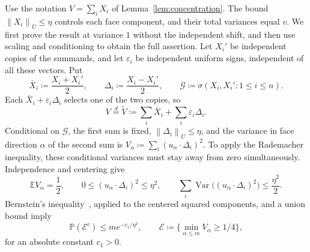 \documentclass[11pt,letterpaper]{article}
\theoremstyle{remark}
\newcommand{\E}{\mathbb E}
\newcommand{\Pp}{\mathbb P}
\newcommand{\Var}{\operatorname{Var}}
\newcommand{\norm}[1]{\left\lVert#1\right\rVert}
\begin{document}
Use the notation \(V=\sum_iX_i\) of Lemma~\ref{lem:concentration}.
The bound \(\norm{X_i}_U\le\eta\) controls each face component,
and their total variances equal \(v\). We first prove the result
at variance \(1\) without the independent shift, and then use scaling
and conditioning to obtain the full assertion. Let \(X_i'\) be independent copies of the
summands, and let \(\varepsilon_i\) be independent uniform signs,
independent of all these vectors. Put
\[
 \bar X_i\coloneqq\frac{X_i+X_i'}2,\qquad
 \Delta_i\coloneqq\frac{X_i-X_i'}2,\qquad
 \mathcal G\coloneqq\sigma(X_i,X_i':1\le i\le n).
\]
Each \(\bar X_i+\varepsilon_i\Delta_i\) selects one of the two
copies, so
\begin{equation}
 V\stackrel d=\widetilde V\coloneqq
 \sum_i\bar X_i+\sum_i\varepsilon_i\Delta_i.
 \label{appx-eq:pair-representation}
\end{equation}
Conditional on \(\mathcal G\), the first sum is fixed,
\(\norm{\Delta_i}_U\le\eta\), and the variance in face direction
\(\alpha\) of the second sum is
\(V_\alpha\coloneqq\sum_i(u_\alpha\cdot\Delta_i)^2\).
To apply the Rademacher inequality, these conditional variances
must stay away from zero simultaneously. Independence and centering give
\[
 \E V_\alpha=\frac12,\qquad
 0\le(u_\alpha\cdot\Delta_i)^2\le\eta^2,\qquad
 \sum_i\Var\bigl((u_\alpha\cdot\Delta_i)^2\bigr)
 \le\frac{\eta^2}{2}.
\]
Bernstein's inequality~\cite[Chapter~2]{BLM2013}, applied to the
centered squared components, and a union bound imply
\begin{equation}
 \Pp(\mathcal E^c)\le m e^{-c_1/\eta^2},\qquad
 \mathcal E\coloneqq\{\min_{\alpha\le m}V_\alpha\ge1/4\},
 \label{appx-eq:conditional-variance}
\end{equation}
for an absolute constant \(c_1>0\).
\end{document}
